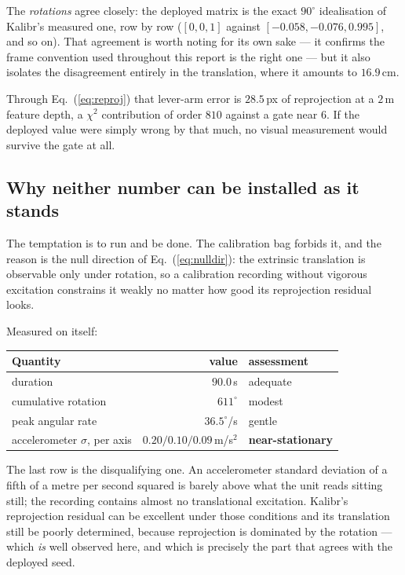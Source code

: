 \noindent The \emph{rotations} agree closely: the deployed matrix is the
exact $90^\circ$ idealisation of Kalibr's measured one, row by row
($[0,0,1]$ against $[-0.058,-0.076,0.995]$, and so on). That agreement is
worth noting for its own sake --- it confirms the frame convention used
throughout this report is the right one --- but it also isolates the
disagreement entirely in the translation, where it amounts to $16.9$\,cm.

Through Eq.~(\ref{eq:reproj}) that lever-arm error is $28.5$\,px of
reprojection at a $2$\,m feature depth, a $\chi^2$ contribution of order
$810$ against a gate near $6$. If the deployed value were simply wrong by
that much, no visual measurement would survive the gate at all.

\subsection{Why neither number can be installed as it stands}

The temptation is to run  and be done. The
calibration bag forbids it, and the reason is the null direction of
Eq.~(\ref{eq:nulldir}): the extrinsic translation is observable only under
rotation, so a calibration recording without vigorous excitation constrains
it weakly no matter how good its reprojection residual looks.

Measured on  itself:

\begin{center}
\begin{tabular}{@{}lrl@{}}
\toprule
Quantity & value & assessment \\
\midrule
duration & $90.0$\,s & adequate \\
cumulative rotation & $611^\circ$ & modest \\
peak angular rate & $36.5^\circ$/s & gentle \\
accelerometer $\sigma$, per axis & $0.20/0.10/0.09$\,m/s$^2$ & \textbf{near-stationary} \\
\bottomrule
\end{tabular}
\end{center}

\noindent The last row is the disqualifying one. An accelerometer standard
deviation of a fifth of a metre per second squared is barely above what the
unit reads sitting still; the recording contains almost no translational
excitation. Kalibr's reprojection residual can be excellent under those
conditions and its translation still be poorly determined, because
reprojection is dominated by the rotation --- which \emph{is} well observed
here, and which is precisely the part that agrees with the deployed seed.


